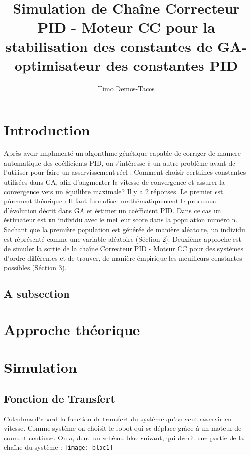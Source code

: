 \documentclass[11pt]{article} %
\title{Simulation de Chaîne Correcteur PID - Moteur CC pour la stabilisation des constantes de GA-optimisateur des constantes PID}
\author{Timo Demos-Tacos}
\begin{document}
\maketitle

\section{Introduction}

Après avoir implimenté un algorithme génétique capable de corriger de manière automatique des coéfficients PID, on s'intèresse à un autre problème avant de l'utiliser pour faire un asservissement réel : Comment choisir certaines constantes utilisées dans GA, afin d'augmenter la vitesse de convergence et assurer la convergence vers un équilibre maximale? Il y a 2 réponses. Le premier est pûrement théorique : Il faut formaliser mathématiquement le processus d'évolution décrit dans GA et éstimer un coéfficient PID. Dans ce cas un éstimateur est un individu avec le meilleur score dans la population numéro n. Sachant que la première population est générée de manière aléatoire, un individu est réprésenté comme une variable aléatoire (Séction 2). Deuxième approche est de simuler la sortie de la chaîne Correcteur PID - Moteur CC pour des systèmes d'ordre différentes et de trouver, de manière émpirique les meuilleurs constantes possibles (Séction 3).


\subsection{A subsection}

\section{Approche théorique}

\section{Simulation}

\subsection{Fonction de Transfert}

Calculons d'abord la fonction de transfert du système qu'on veut asservir en vitesse. Comme système on choisit le robot qui se déplace grâce à un moteur de courant continue. On a, donc un schèma bloc suivant, qui décrit une partie de la chaîne du système :
\texttt{[image: bloc1]}
\end{document}
